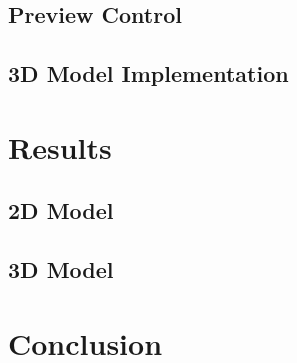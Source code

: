 \documentclass{UoNMCHA}
\begin{document}
		\subsection{Preview Control}
			
		\subsection{3D Model Implementation}
			
					
	\clearpage		
	\newpage\section{Results}\label{sec:Results}
		\subsection{2D Model}
			
		\subsection{3D Model}
			
	
	\clearpage
	\newpage\section{Conclusion}\label{sec:Conclusion}
		

	\newpage %
		
\end{document}
